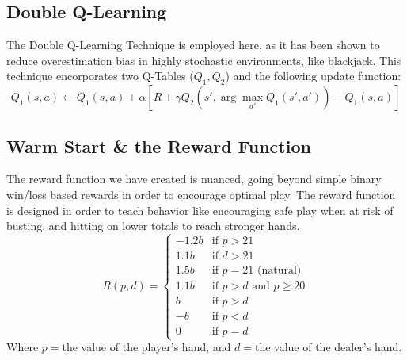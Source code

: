 \documentclass[10pt]{article}
\theoremstyle{definition}
\begin{document}
\subsection{Double Q-Learning}
The Double Q-Learning Technique \cite{hasselt2010double} is employed here, 
as it has been shown to reduce overestimation bias in highly stochastic environments, like blackjack.
This technique encorporates two Q-Tables (\(Q_1,Q_2\)) and the following update function:
\[Q_1(s,a) \leftarrow Q_1(s,a) + \alpha[R + \gamma Q_2(s',\arg\max_{a'} Q_1(s',a')) - Q_1(s,a)]\]
\subsection{Warm Start \& the Reward Function}
The reward function we have created is nuanced, going beyond simple binary win/loss based rewards in order to encourage optimal play.
The reward function is designed in order to teach behavior like encouraging safe play when at risk of busting, and hitting on lower totals to reach stronger hands.
\begin{equation}
    R(p,d) = \begin{cases}
    -1.2b & \text{if } p > 21 \\
    1.1b & \text{if } d > 21 \\
    1.5b & \text{if } p = 21 \text{ (natural)} \\
    1.1b & \text{if } p > d \text{ and } p \geq 20 \\
    b & \text{if } p > d \\
    -b & \text{if } p < d \\
    0 & \text{if } p = d
    \end{cases}
\end{equation}
Where \(p=\)the value of the player's hand, and \(d=\)the value of the dealer's hand.\\
\end{document}
